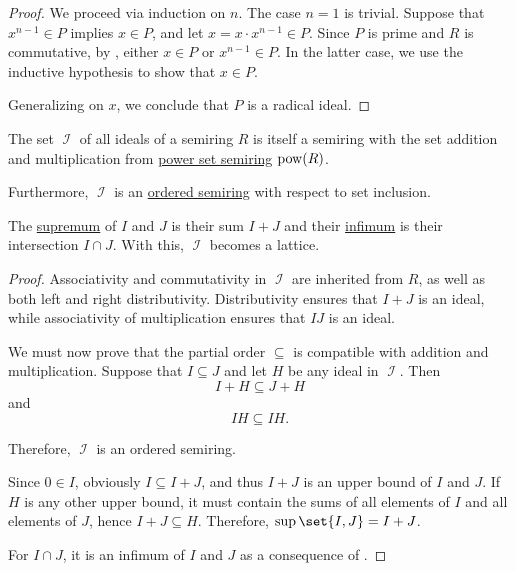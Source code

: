 \begin{proof}
  We proceed via induction on \( n \). The case \( n = 1 \) is trivial. Suppose that \( x^{n-1} \in P \) implies \( x \in P \), and let \( x = x \cdot x^{n-1} \in P \). Since \( P \) is prime and \( R \) is commutative, by , either \( x \in P \) or \( x^{n-1} \in P \). In the latter case, we use the inductive hypothesis to show that \( x \in P \).

  Generalizing on \( x \), we conclude that \( P \) is a radical ideal.
\end{proof}

\begin{proposition}\label{thm:semiring_of_ideals}
  \hfill
  \begin{thmenum}
     The set \( \mscrI \) of all ideals of a semiring \( R \) is itself a semiring with the set addition and multiplication from \hyperref[def:semiring/power_set]{power set semiring} \( \operatorname{pow}(R) \).

     Furthermore, \( \mscrI \) is an \hyperref[def:ordered_semiring]{ordered semiring} with respect to set inclusion.

     The \hyperref[def:partially_ordered_set_extremal_points/supremum_and_infimum]{supremum} of \( I \) and \( J \) is their sum \( I + J \) and their \hyperref[def:partially_ordered_set_extremal_points/supremum_and_infimum]{infimum} is their intersection \( I \cap J \). With this, \( \mscrI \) becomes a lattice.
  \end{thmenum}
\end{proposition}
\begin{proof}
   Associativity and commutativity in \( \mscrI \) are inherited from \( R \), as well as both left and right distributivity. Distributivity ensures that \( I + J \) is an ideal, while associativity of multiplication ensures that \( IJ \) is an ideal.

   We must now prove that the partial order \( \subseteq \) is compatible with addition and multiplication. Suppose that \( I \subseteq J \) and let \( H \) be any ideal in \( \mscrI \). Then
  \begin{equation*}
    I + H \subseteq J + H
  \end{equation*}
  and
  \begin{equation*}
    IH \subseteq IH.
  \end{equation*}

  Therefore, \( \mscrI \) is an ordered semiring.

   Since \( 0 \in I \), obviously \( I \subseteq I + J \), and thus \( I + J \) is an upper bound of \( I \) and \( J \). If \( H \) is any other upper bound, it must contain the sums of all elements of \( I \) and all elements of \( J \), hence \( I + J \subseteq H \). Therefore, \( \sup\set{I, J} = I + J \).

  For \( I \cap J \), it is an infimum of \( I \) and \( J \) as a consequence of .
\end{proof}

